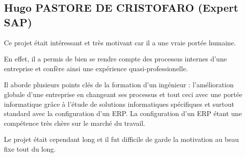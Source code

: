 \subsection{Hugo PASTORE DE CRISTOFARO (Expert SAP)}

Ce projet était intéressant et très motivant car il a une vraie portée humaine.

En effet, il a permis de bien se rendre compte des processus internes d'une 
entreprise et confère ainsi une expérience quasi-professionelle. 

Il aborde plusieurs points clés de la formation d'un ingénieur : l'amélioration 
globale d'une entreprise en changeant ses processus et tout ceci avec une portée 
informatique grâce à l'étude de solutions informatiques spécifiques et surtout 
standard avec la configuration d'un ERP. La configuration d'un ERP étant une 
compétence très chère sur le marché du travail.

Le projet était cependant long et il fut difficile de garde la motivation au 
beau fixe tout du long.
